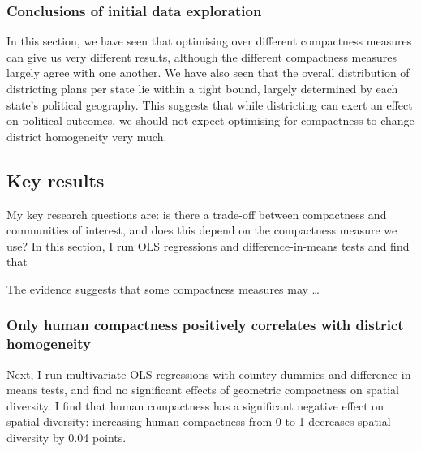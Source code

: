 \documentclass[]{article}
\begin{document}
\hypertarget{conclusions-of-initial-data-exploration}{%
\subsubsection{Conclusions of initial data
exploration}\label{conclusions-of-initial-data-exploration}}

In this section, we have seen that optimising over different compactness
measures can give us very different results, although the different
compactness measures largely agree with one another. We have also seen
that the overall distribution of districting plans per state lie within
a tight bound, largely determined by each state's political geography.
This suggests that while districting can exert an effect on political
outcomes, we should not expect optimising for compactness to change
district homogeneity very much.

\hypertarget{key-results}{%
\subsection{Key results}\label{key-results}}

My key research questions are: is there a trade-off between compactness
and communities of interest, and does this depend on the compactness
measure we use? In this section, I run OLS regressions and
difference-in-means tests and find that

The evidence suggests that some compactness measures may \ldots{}

\hypertarget{only-human-compactness-positively-correlates-with-district-homogeneity}{%
\subsubsection{Only human compactness positively correlates with
district
homogeneity}\label{only-human-compactness-positively-correlates-with-district-homogeneity}}

Next, I run multivariate OLS regressions with country dummies and
difference-in-means tests, and find no significant effects of geometric
compactness on spatial diversity. I find that human compactness has a
significant negative effect on spatial diversity: increasing human
compactness from 0 to 1 decreases spatial diversity by 0.04 points.
\end{document}
